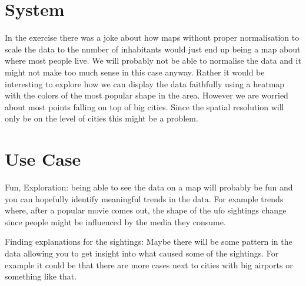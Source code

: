 \documentclass{scrartcl}
\begin{document}
\section{System}
In the exercise there was a joke about how maps without proper normalisation to scale the data to
the number of inhabitants would just end up being a map about where most people live. We will
probably not be able to normalise the data and it might not make too much sense in this case
anyway. Rather it would be interesting to explore how we can display the data faithfully using
a heatmap with the colors of the most popular shape in the area. However we are worried about
most points falling on top of big cities. Since the spatial resolution will only be on the level
of cities this might be a problem.


\section{Use Case}
Fun, Exploration: being able to see the data on a map will probably be fun and you can hopefully identify meaningful trends in the data. For example trends where, after a popular movie comes out, the shape of the ufo sightings change since people might be influenced by the media they consume.

Finding explanations for the sightings: Maybe there will be some pattern in the data allowing you to get insight into what caused some of the sightings. For example it could be that there are more cases next to cities with big airports or something like that.
\end{document}
